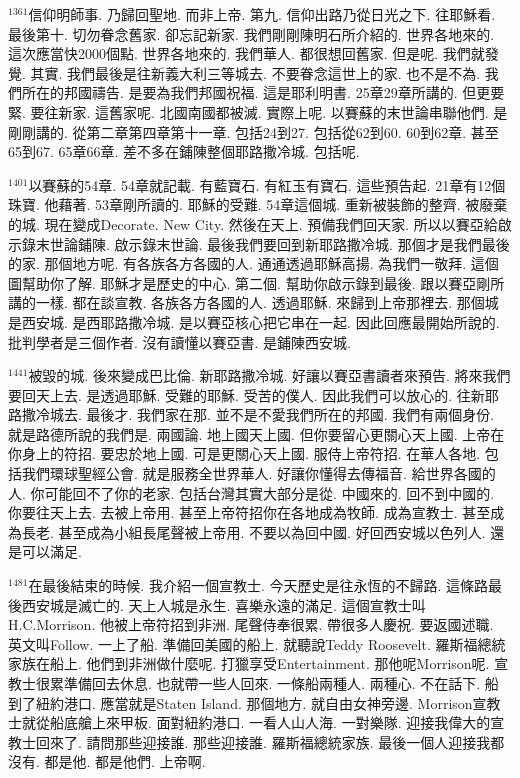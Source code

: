 \documentclass{book}
\begin{document}
$^{1361}$信仰明師事.
乃歸回聖地.
而非上帝.
第九.
信仰出路乃從日光之下.
往耶穌看.
最後第十.
切勿眷念舊家.
卻忘記新家.
我們剛剛陳明石所介紹的.
世界各地來的.
這次應當快2000個點.
世界各地來的.
我們華人.
都很想回舊家.
但是呢.
我們就發覺.
其實.
我們最後是往新義大利三等城去.
不要眷念這世上的家.
也不是不為.
我們所在的邦國禱告.
是要為我們邦國祝福.
這是耶利明書.
25章29章所講的.
但更要緊.
要往新家.
這舊家呢.
北國南國都被滅.
實際上呢.
以賽蘇的末世論串聯他們.
是剛剛講的.
從第二章第四章第十一章.
包括24到27.
包括從62到60.
60到62章.
甚至65到67.
65章66章.
差不多在鋪陳整個耶路撒冷城.
包括呢.

$^{1401}$以賽蘇的54章.
54章就記載.
有藍寶石.
有紅玉有寶石.
這些預告起.
21章有12個珠寶.
他藉著.
53章剛所讀的.
耶穌的受難.
54章這個城.
重新被裝飾的整齊.
被廢棄的城.
現在變成Decorate.
New City.
然後在天上.
預備我們回天家.
所以以賽亞給啟示錄末世論鋪陳.
啟示錄末世論.
最後我們要回到新耶路撒冷城.
那個才是我們最後的家.
那個地方呢.
有各族各方各國的人.
通通透過耶穌高揚.
為我們一敬拜.
這個圖幫助你了解.
耶穌才是歷史的中心.
第二個.
幫助你啟示錄到最後.
跟以賽亞剛所講的一樣.
都在談宣教.
各族各方各國的人.
透過耶穌.
來歸到上帝那裡去.
那個城是西安城.
是西耶路撒冷城.
是以賽亞核心把它串在一起.
因此回應最開始所說的.
批判學者是三個作者.
沒有讀懂以賽亞書.
是鋪陳西安城.

$^{1441}$被毀的城.
後來變成巴比倫.
新耶路撒冷城.
好讓以賽亞書讀者來預告.
將來我們要回天上去.
是透過耶穌.
受難的耶穌.
受苦的僕人.
因此我們可以放心的.
往新耶路撒冷城去.
最後才.
我們家在那.
並不是不愛我們所在的邦國.
我們有兩個身份.
就是路德所說的我們是.
兩國論.
地上國天上國.
但你要留心更關心天上國.
上帝在你身上的符招.
要忠於地上國.
可是更關心天上國.
服侍上帝符招.
在華人各地.
包括我們環球聖經公會.
就是服務全世界華人.
好讓你懂得去傳福音.
給世界各國的人.
你可能回不了你的老家.
包括台灣其實大部分是從.
中國來的.
回不到中國的.
你要往天上去.
去被上帝用.
甚至上帝符招你在各地成為牧師.
成為宣教士.
甚至成為長老.
甚至成為小組長尾聲被上帝用.
不要以為回中國.
好回西安城以色列人.
還是可以滿足.

$^{1481}$在最後結束的時候.
我介紹一個宣教士.
今天歷史是往永恆的不歸路.
這條路最後西安城是滅亡的.
天上人城是永生.
喜樂永遠的滿足.
這個宣教士叫H.C.Morrison.
他被上帝符招到非洲.
尾聲侍奉很累.
帶很多人慶祝.
要返國述職.
英文叫Follow.
一上了船.
準備回美國的船上.
就聽說Teddy Roosevelt.
羅斯福總統家族在船上.
他們到非洲做什麼呢.
打獵享受Entertainment.
那他呢Morrison呢.
宣教士很累準備回去休息.
也就帶一些人回來.
一條船兩種人.
兩種心.
不在話下.
船到了紐約港口.
應當就是Staten Island.
那個地方.
就自由女神旁邊.
Morrison宣教士就從船底艙上來甲板.
面對紐約港口.
一看人山人海.
一對樂隊.
迎接我偉大的宣教士回來了.
請問那些迎接誰.
那些迎接誰.
羅斯福總統家族.
最後一個人迎接我都沒有.
都是他.
都是他們.
上帝啊.
\end{document}
